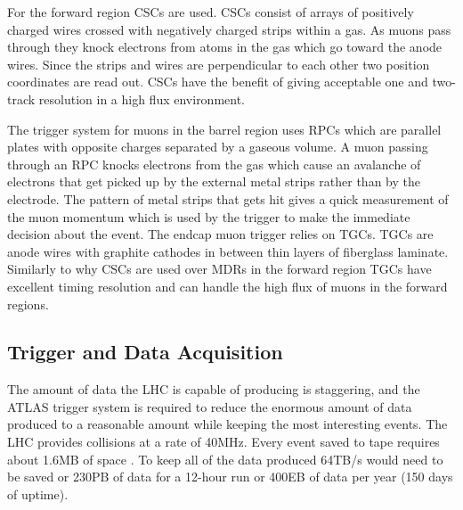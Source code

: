 For the forward region CSCs are used.  CSCs consist of arrays of positively charged wires crossed with negatively charged strips within a gas.  As muons pass through they knock electrons from atoms in the gas which go toward the anode wires. Since the strips and wires are perpendicular to each other two position coordinates are read out.  CSCs have the benefit of giving acceptable one and two-track resolution in a high flux environment.

The trigger system for muons in the barrel region uses RPCs which are parallel plates with opposite charges separated by a gaseous volume. A muon passing through an RPC knocks electrons from the gas which cause an avalanche of electrons that get picked up by the external metal strips rather than by the electrode.  The pattern of metal strips that gets hit gives a quick measurement of the muon momentum which is used by the trigger to make the immediate decision about the event.
The endcap muon trigger relies on TGCs.  TGCs are anode wires with graphite cathodes in between thin layers of fiberglass laminate.  Similarly to why CSCs are used over MDRs in the forward region TGCs have excellent timing resolution and can handle the high flux of muons in the forward regions.


\subsection{Trigger and Data Acquisition}
\label{sec:TDAQ}
The amount of data the LHC is capable of producing is staggering, and the ATLAS trigger system is required to reduce the enormous amount of data produced to a reasonable amount while keeping the most interesting events.  The LHC provides collisions at a rate of 40MHz.  Every event saved to tape requires about 1.6MB of space \cite{Outreach:1457044}. To keep all of the data produced 64TB/s would need to be saved or 230PB of data for a 12-hour run or 400EB of data per year (150 days of uptime). 

